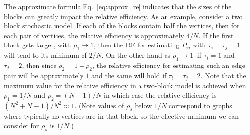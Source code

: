 \documentclass[10pt,letterpaper]{article}
\begin{document}
The approximate formula Eq.~\ref{eq:approx_re} indicates that the sizes of the blocks can greatly impact the relative efficiency.
As an example, consider a two block stochastic model. 
If each of the blocks contain half the vertices, then for each pair of vertices, the relative efficiency is approximately $4/N$. 
If the first block gets larger, with $\rho_1\to 1$, then the RE for estimating $P_{ij}$ with $\tau_i=\tau_j=1$ will tend to its minimum of $2/N$. 
On the other hand as $\rho_1\to 1$, if $\tau_i=1$ and $\tau_j=2$, then since $\rho_2=1-\rho_2$, the relative efficiency for estimating such an edge pair will be approximately $1$ and the same will hold if $\tau_i=\tau_j=2$.
Note that the maximum value for the relative efficiency in a two-block model is achieved when $\rho_1=1/N$ and $\rho_2=(N-1)/N$ in which case the relative efficiency is $(N^2+N-1)/N^2\approx 1$.
(Note values of $\rho_s$ below $1/N$ correspond to graphs where typically no vertices are in that block, so the effective minimum we can consider for $\rho_s$ is $1/N$.)

\end{document}
